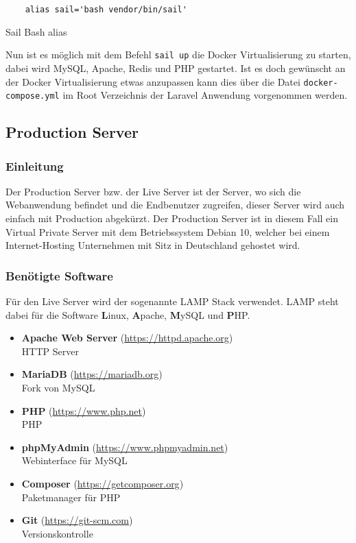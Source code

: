 \begin{listing}[H]
  \begin{verbatim}
    alias sail='bash vendor/bin/sail'
  \end{verbatim}
  \caption{Sail Bash alias}
\end{listing}

Nun ist es möglich mit dem Befehl \verb|sail up| die Docker Virtualisierung zu
starten, dabei wird MySQL, Apache, Redis und PHP gestartet. Ist es doch
gewünscht an der Docker Virtualisierung etwas anzupassen kann dies über die
Datei \verb|docker-compose.yml| im Root Verzeichnis der Laravel Anwendung
vorgenommen werden.

\subsection{Production Server}
\subsubsection{Einleitung}
Der Production Server bzw. der Live Server ist der Server, wo sich die
Webanwendung befindet und die Endbenutzer zugreifen, dieser Server wird auch
einfach mit Production abgekürzt. Der Production Server ist in diesem Fall ein
Virtual Private Server mit dem Betriebssystem Debian 10, welcher bei einem
Internet-Hosting Unternehmen mit Sitz in Deutschland gehostet wird.

\subsubsection{Benötigte Software}
Für den Live Server wird der sogenannte \glqq LAMP\grqq{} Stack verwendet. LAMP steht dabei
für die Software \textbf{L}inux, \textbf{A}pache, \textbf{M}ySQL und \textbf{P}HP.

\begin{itemize}
  \item \textbf{Apache Web Server} (\url{https://httpd.apache.org}) \\ HTTP Server
  \item \textbf{MariaDB} (\url{https://mariadb.org}) \\ Fork von MySQL
  \item \textbf{PHP} (\url{https://www.php.net}) \\ \ac*{PHP}
  \item \textbf{phpMyAdmin} (\url{https://www.phpmyadmin.net}) \\ Webinterface
        für MySQL
  \item \textbf{Composer} (\url{https://getcomposer.org}) \\ Paketmanager für PHP
  \item \textbf{Git} (\url{https://git-scm.com}) \\ Versionskontrolle
\end{itemize}


